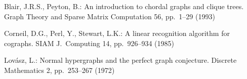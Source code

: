 \documentclass{llncs}
\begin{document}
\begin{thebibliography}{[BPS85]}
Blair, J.R.S., Peyton, B.:
An introduction to chordal graphs and clique trees.
Graph Theory and Sparse Matrix Computation 56, pp.~1--29 (1993)

Corneil, D.G., Perl, Y., Stewart, L.K.:
A linear recognition algorithm for cographs.
SIAM J.~Computing 14, pp.~926--934 (1985)

Lov{\'{a}}sz, L.:
Normal hypergraphs and the perfect graph conjecture.
Discrete Mathematics 2, pp.~253--267 (1972)
\end{thebibliography}

 
\end{document}
